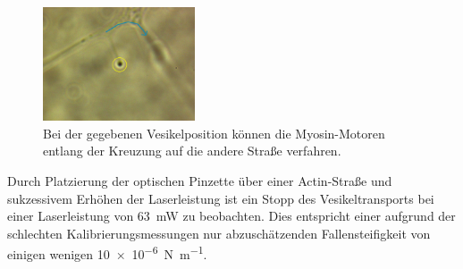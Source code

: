         \FloatBarrier
        \begin{figure}[h]
        \centering
        \includegraphics[width = 0.4\textwidth]{pictures/vesikel_transport.png}
        \caption{Bei der gegebenen Vesikelposition können die Myosin-Motoren entlang der Kreuzung auf die andere Straße verfahren.}
        \label{fig:vesikel_sprung}
        \end{figure}
        \FloatBarrier 
        Durch Platzierung der optischen Pinzette über einer Actin-Straße und sukzessivem Erhöhen der Laserleistung ist ein Stopp des Vesikeltransports bei einer Laserleistung von \SI{63}{\milli\watt} zu 
        beobachten. Dies entspricht einer aufgrund der schlechten Kalibrierungsmessungen nur abzuschätzenden Fallensteifigkeit von einigen wenigen \SI{10e-6}{\newton\per\metre}. 